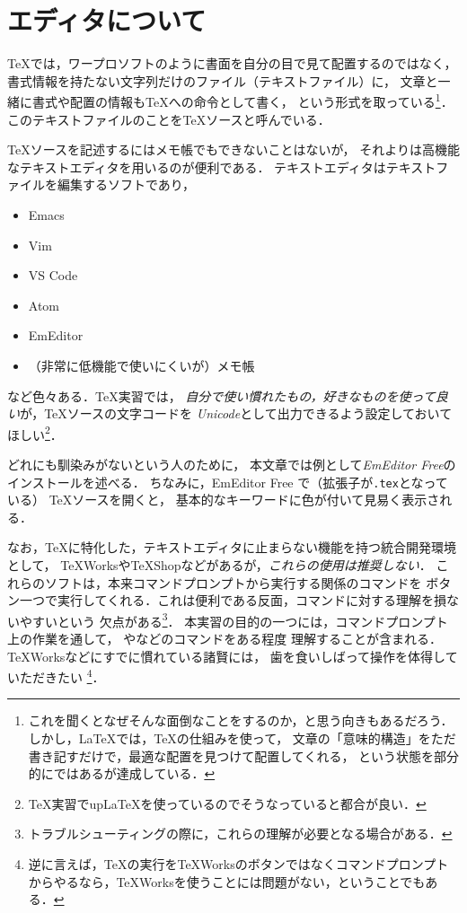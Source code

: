 \documentclass{ltjsarticle}
\begin{document}
\section{エディタについて} \label{about_editor}
\TeX では，ワープロソフトのように書面を自分の目で見て配置するのではなく，
書式情報を持たない文字列だけのファイル（テキストファイル）に，
文章と一緒に書式や配置の情報も\TeX への命令として書く，
という形式を取っている\footnote{%
これを聞くとなぜそんな面倒なことをするのか，と思う向きもあるだろう．
しかし，\LaTeX では，\TeX の仕組みを使って，
文章の「意味的構造」をただ書き記すだけで，最適な配置を見つけて配置してくれる，
という状態を部分的にではあるが達成している．}．
このテキストファイルのことを\TeX ソースと呼んでいる．


\TeX ソースを記述するにはメモ帳でもできないことはないが，
それよりは高機能なテキストエディタを用いるのが便利である．
テキストエディタはテキストファイルを編集するソフトであり，
\begin{itemize}
\item Emacs
\item Vim
\item VS Code
\item Atom
\item EmEditor
\item （非常に低機能で使いにくいが）メモ帳
\end{itemize}
など色々ある．\TeX 実習では，
\emph{自分で使い慣れたもの，好きなものを使って良い}が，\TeX ソースの文字コードを
\emph{Unicode}として出力できるよう設定しておいてほしい\footnote{%
  \TeX 実習でup\LaTeX を使っているのでそうなっていると都合が良い．}．

どれにも馴染みがないという人のために，
本文章では例として\emph{EmEditor Free}のインストールを述べる．
ちなみに，EmEditor Free で（拡張子が\texttt{.tex}となっている） \TeX ソースを開くと，
基本的なキーワードに色が付いて見易く表示される．

なお，\TeX に特化した，テキストエディタに止まらない機能を持つ統合開発環境として，
\TeX Worksや\TeX Shopなどがあるが，\emph{これらの使用は推奨しない}．
これらのソフトは，本来コマンドプロンプトから実行する関係のコマンドを
ボタン一つで実行してくれる．これは便利である反面，コマンドに対する理解を損ないやすいという
欠点がある\footnote{トラブルシューティングの際に，これらの理解が必要となる場合がある．}．
本実習の目的の一つには，コマンドプロンプト上の作業を通して，
やなどのコマンドをある程度
理解することが含まれる．\TeX Worksなどにすでに慣れている諸賢には，
歯を食いしばって操作を体得していただきたい
\footnote{逆に言えば，\TeX の実行を\TeX Worksのボタンではなくコマンドプロンプト
からやるなら，\TeX Worksを使うことには問題がない，ということでもある．}．
\end{document}
